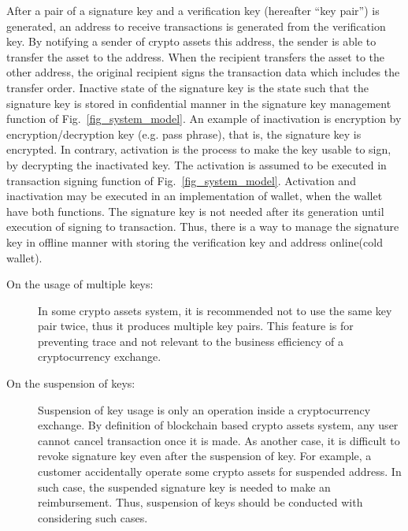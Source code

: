 After a pair of a signature key and a verification key (hereafter “key pair”) is generated, an address to receive transactions is generated from the verification key. By notifying a sender of crypto assets this address, the sender is able to transfer the asset to the address. When the recipient transfers the asset to the other address, the original recipient signs the transaction data which includes the transfer order. Inactive state of the signature key is the state such that the signature key is stored in confidential manner in the signature key management function of Fig.~\ref{fig_system_model}. An example of inactivation is encryption by encryption/decryption key (e.g. pass phrase), that is, the signature key is encrypted. In contrary, activation is the process to make the key usable to sign, by decrypting the inactivated key. The activation is assumed to be executed in transaction signing function of Fig.~\ref{fig_system_model}. Activation and inactivation may be executed in an implementation of wallet, when the wallet have both functions. The signature key is not needed after its generation until execution of signing to transaction. Thus, there is a way to manage the signature key in offline manner with storing the verification key and address online(cold wallet).

\begin{description}
 \item[On the usage of multiple keys:]
       In some crypto assets system, it is recommended not to use the same key pair twice, thus it produces multiple key pairs. This feature is for preventing trace and not relevant to the business efficiency of a cryptocurrency exchange.
 \item[On the suspension of keys:]
       Suspension of key usage is only an operation inside a cryptocurrency exchange. By definition of blockchain based crypto assets system, any user cannot cancel transaction once it is made. As another case, it is difficult to revoke signature key even after the suspension of key. For example, a customer accidentally operate some crypto assets for suspended address. In such case, the suspended signature key is needed to make an reimbursement. Thus, suspension of keys should be conducted with considering such cases.
\end{description}


